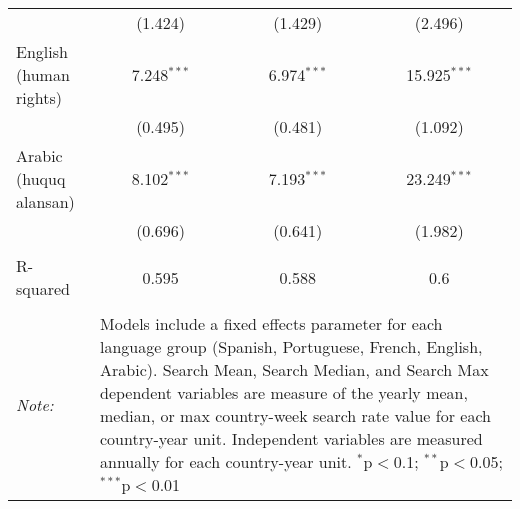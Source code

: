 \begin{table}[!htbp]
\begin{tabular}{@{\extracolsep{5pt}}lccc}
  & (1.424) & (1.429) & (2.496) \\ 
  English (human rights) & 7.248$^{***}$ & 6.974$^{***}$ & 15.925$^{***}$ \\ 
  & (0.495) & (0.481) & (1.092) \\ 
  Arabic (huquq alansan) & 8.102$^{***}$ & 7.193$^{***}$ & 23.249$^{***}$ \\ 
  & (0.696) & (0.641) & (1.982) \\ 
 \hline \\[-1.8ex] 
R-squared  & 0.595 & 0.588 & 0.6 \\ 
\hline 
\hline \\[-1.8ex] 
\textit{Note:}  & \multicolumn{3}{l}{\parbox[t]{8cm}{Models include a fixed effects parameter for each language group (Spanish, Portuguese, French, English, Arabic). Search Mean, Search Median, and Search Max dependent variables are measure of the yearly mean, median, or max country-week search rate value for each country-year unit. Independent variables are measured annually for each country-year unit. $^{*}$p$<$0.1; $^{**}$p$<$0.05; $^{***}$p$<$0.01}} \\ 
\end{tabular} 
\end{table} 

